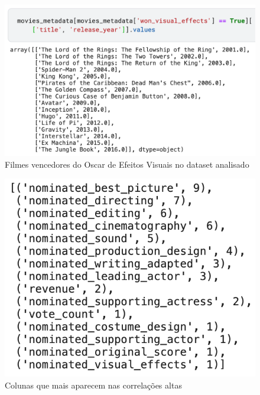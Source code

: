             \begin{figure}[htb]
            	\caption{\label{vencedores_efeitos}Filmes vencedores do Oscar de Efeitos Visuais no dataset analisado}
            	\begin{center}
            		\includegraphics[scale=0.7]{vencedores_efeitos.png}
            	\end{center}
            \end{figure}

            \begin{figure}[htb]
            	\caption{\label{colunas_influentes}Colunas que mais aparecem nas correlações altas}
            	\begin{center}
            		\includegraphics[scale=0.7]{colunas_influentes.png}
            	\end{center}
            \end{figure}

